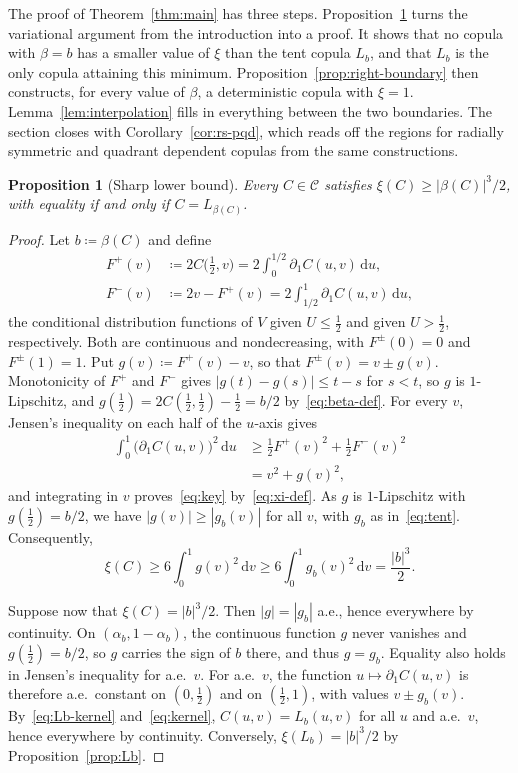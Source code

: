 \documentclass[twocolumn,a4paper]{article}
\numberwithin{equation}{section}
\newtheorem{proposition}[theorem]{Proposition}
\theoremstyle{remark}
\newcommand{\CC}{\mathcal{C}}
\newcommand{\1}{\mathbf{1}}
\newcommand{\de}{\,\mathrm{d}}
\begin{document}
The proof of Theorem~\ref{thm:main} has three steps.
Proposition~\ref{prop:sharp} turns the variational argument from the introduction into a proof.
It shows that no copula with \(\beta=b\) has a smaller value of \(\xi\) than the tent copula \(L_b\), and that \(L_b\) is the only copula attaining this minimum.
Proposition~\ref{prop:right-boundary} then constructs, for every value of \(\beta\), a deterministic copula with \(\xi=1\).
Lemma~\ref{lem:interpolation} fills in everything between the two boundaries.
The section closes with Corollary~\ref{cor:rs-pqd}, which reads off the regions for radially symmetric and quadrant dependent copulas from the same constructions.

\begin{proposition}[Sharp lower bound]\label{prop:sharp}
Every \(C\in\CC\) satisfies \(\xi(C)\ge|\beta(C)|^3/2\), with equality if and only if \(C=L_{\beta(C)}\).
\end{proposition}

\begin{proof}
Let \(b\coloneqq\beta(C)\) and define
\begin{align*}
F^+(v)&\coloneqq2C\bigl(\tfrac12,v\bigr)=2\int_0^{1/2}\partial_1C(u,v)\de u,\\
F^-(v)&\coloneqq2v-F^+(v)=2\int_{1/2}^1\partial_1C(u,v)\de u,
\end{align*}
the conditional distribution functions of \(V\) given \(U\le\tfrac12\) and given \(U>\tfrac12\), respectively.
Both are continuous and nondecreasing, with \(F^\pm(0)=0\) and \(F^\pm(1)=1\).
Put \(g(v)\coloneqq F^+(v)-v\), so that \(F^\pm(v)=v\pm g(v)\).
Monotonicity of \(F^+\) and \(F^-\) gives \(|g(t)-g(s)|\le t-s\) for \(s<t\), so \(g\) is \(1\)-Lipschitz, and \(g(\tfrac12)=2C(\tfrac12,\tfrac12)-\tfrac12=b/2\) by~\eqref{eq:beta-def}.
For every \(v\), Jensen's inequality on each half of the \(u\)-axis gives
\begin{align*}
\int_0^1\bigl(\partial_1C(u,v)\bigr)^2\de u
&\ge\tfrac12F^+(v)^2+\tfrac12F^-(v)^2\\
&=v^2+g(v)^2,
\end{align*}
and integrating in \(v\) proves~\eqref{eq:key} by~\eqref{eq:xi-def}.
As \(g\) is \(1\)-Lipschitz with \(g(\tfrac12)=b/2\), we have \(|g(v)|\ge|g_b(v)|\) for all \(v\), with \(g_b\) as in~\eqref{eq:tent}.
Consequently,
\[
\xi(C)\ge6\int_0^1g(v)^2\de v\ge6\int_0^1g_b(v)^2\de v=\frac{|b|^3}2.
\]

Suppose now that \(\xi(C)=|b|^3/2\).
Then \(|g|=|g_b|\) a.e., hence everywhere by continuity.
On \((\alpha_b,1-\alpha_b)\), the continuous function \(g\) never vanishes and \(g(\tfrac12)=b/2\), so \(g\) carries the sign of \(b\) there, and thus \(g=g_b\).
Equality also holds in Jensen's inequality for a.e.\ \(v\).
For a.e.\ \(v\), the function \(u\mapsto\partial_1C(u,v)\) is therefore a.e.\ constant on \((0,\tfrac12)\) and on \((\tfrac12,1)\), with values \(v\pm g_b(v)\).
By~\eqref{eq:Lb-kernel} and~\eqref{eq:kernel}, \(C(u,v)=L_b(u,v)\) for all \(u\) and a.e.\ \(v\), hence everywhere by continuity.
Conversely, \(\xi(L_b)=|b|^3/2\) by Proposition~\ref{prop:Lb}.
\end{proof}
\end{document}
